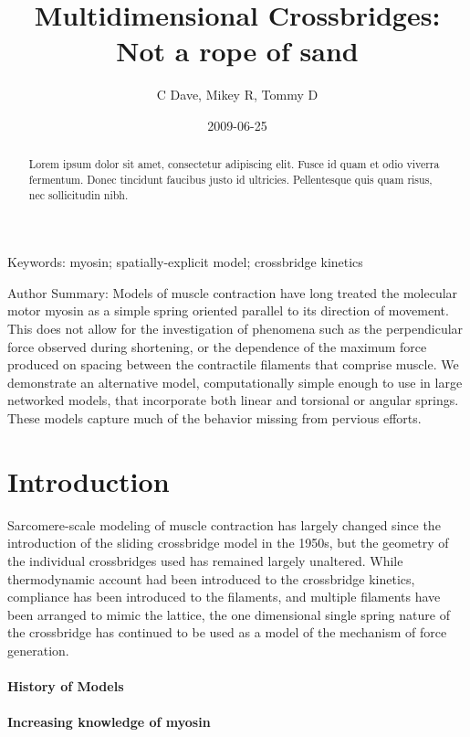\documentclass[]{article}
\title{Multidimensional Crossbridges: Not a rope of sand}
\author{C Dave, Mikey R, Tommy D}
\date{2009-06-25}
\begin{document}
\maketitle

 
\begin{abstract}
	Lorem ipsum dolor sit amet, consectetur adipiscing elit. Fusce id quam et odio viverra fermentum. Donec tincidunt faucibus justo id ultricies. Pellentesque quis quam risus, nec sollicitudin nibh. 
\end{abstract}

Keywords: myosin; spatially-explicit model; crossbridge kinetics

Author Summary: 
Models of muscle contraction have long treated the molecular motor myosin as a simple spring oriented parallel to its direction of movement. 
This does not allow for the investigation of phenomena such as the perpendicular force observed during shortening, or the dependence of the maximum force produced on spacing between the contractile filaments that comprise muscle.
We demonstrate an alternative model, computationally simple enough to use in large networked models, that incorporate both linear and torsional or angular springs. These models capture much of the behavior missing from pervious efforts.

\section{Introduction}
Sarcomere-scale modeling of muscle contraction has largely changed since the introduction of the sliding crossbridge model in the 1950s, but the geometry of the individual crossbridges used has remained largely unaltered. 
While thermodynamic account had been introduced to the crossbridge kinetics, compliance has been introduced to the filaments, and multiple filaments have been arranged to mimic the lattice, the one dimensional single spring nature of the crossbridge has continued to be used as a model of the mechanism of force generation.

\paragraph*{History of Models}


\paragraph*{Increasing knowledge of myosin}
\end{document}
